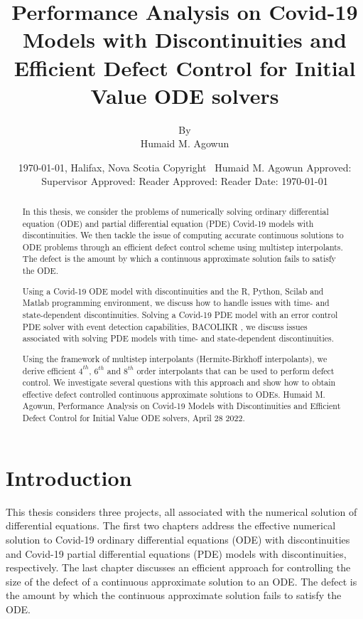 \documentclass{report}
\title{Performance Analysis on Covid-19 Models with Discontinuities and Efficient Defect Control for Initial Value ODE solvers}
\author{
	By\\
	Humaid M. Agowun \\}
\date{\today, Halifax, Nova Scotia\endgraf\smallskip
	Copyright \textcopyright \ Humaid M. Agowun\endgraf\smallskip\endgraf\bigskip
	\hfill Approved: \endgraf\bigskip\endgraf\smallskip
	\endgraf\smallskip\endgraf\smallskip
	\hfill Supervisor\endgraf\smallskip\endgraf\smallskip
	\hfill Approved:  \endgraf\bigskip\endgraf\bigskip
	\endgraf\smallskip\endgraf\smallskip
	\hfill Reader\endgraf\smallskip\endgraf\smallskip
	\hfill Approved:  \endgraf\bigskip\endgraf\bigskip
	\endgraf\smallskip\endgraf\smallskip
	\hfill Reader\endgraf\smallskip\endgraf\smallskip
	\hfill Date: \today }
\begin{document}
	\thispagestyle{empty}
	\maketitle
	\thispagestyle{empty}
	
\begin{abstract}
In this thesis, we consider the problems of numerically solving ordinary differential equation (ODE) and partial differential equation (PDE) Covid-19 models with discontinuities. We then tackle the issue of computing accurate continuous solutions to ODE problems through an efficient defect control scheme using multistep interpolants. The defect is the amount by which a continuous approximate solution fails to satisfy the ODE.

Using a Covid-19 ODE model with discontinuities and the R, Python, Scilab and Matlab programming environment, we discuss how to handle issues with time- and state-dependent discontinuities. Solving a Covid-19 PDE model with an error control PDE solver with event detection capabilities, BACOLIKR \cite{bacolikr}, we discuss issues associated with solving PDE models with time- and state-dependent discontinuities. 

Using the framework of multistep interpolants (Hermite-Birkhoff interpolants), we derive efficient $4^{th}$, $6^{th}$ and $8^{th}$ order interpolants that can be used to perform defect control. We investigate several questions with this approach and show how to obtain effective defect controlled continuous approximate solutions to ODEs. 
\newline \newline
Humaid M. Agowun, Performance Analysis on Covid-19 Models with Discontinuities and Efficient Defect Control for Initial Value ODE solvers, April 28 2022.
\end{abstract}

\chapter{Introduction}
This thesis considers three projects, all associated with the numerical solution of differential equations. The first two chapters address the effective numerical solution to Covid-19 ordinary differential equations (ODE) with discontinuities and Covid-19 partial differential equations (PDE) models with discontinuities, respectively. The last chapter discusses an efficient approach for controlling the size of the defect of a continuous approximate solution to an ODE. The defect is the amount by which the continuous approximate solution fails to satisfy the ODE. 
\end{document}
